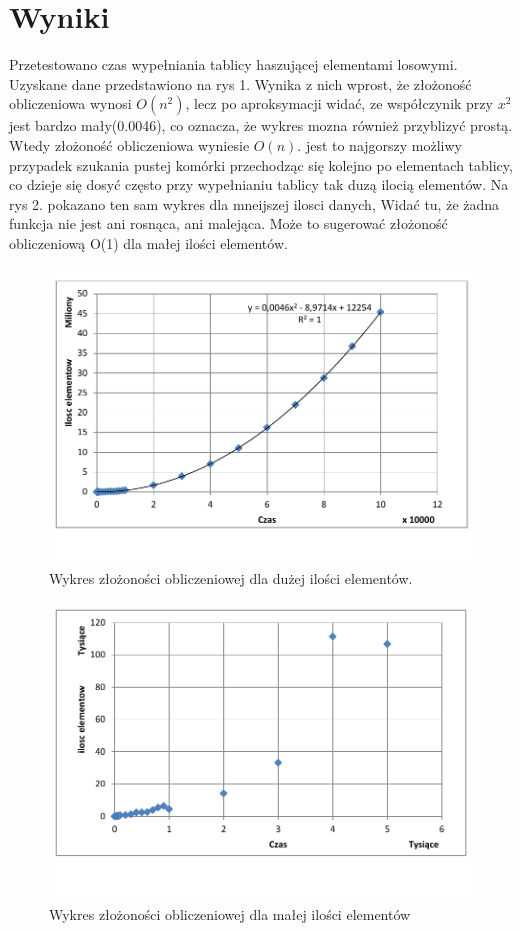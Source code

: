 \section{Wyniki}
Przetestowano czas wypełniania tablicy haszującej elementami losowymi. Uzyskane dane przedstawiono na rys 1. Wynika z nich wprost, że złożoność obliczeniowa wynosi $O(n^{2})$, lecz po aproksymacji widać, ze współczynik przy $x^{2}$ jest bardzo mały(0.0046), co oznacza, że wykres mozna również przyblizyć prostą. Wtedy złożoność obliczeniowa wyniesie $O(n)$. jest to najgorszy możliwy przypadek szukania pustej komórki przechodząc się kolejno po elementach tablicy, co dzieje się dosyć często przy wypełnianiu tablicy tak duzą ilocią elementów. Na rys 2. pokazano ten sam wykres dla mneijszej ilosci danych, Widać tu, że żadna funkcja nie jest ani rosnąca, ani malejąca. Może to sugerować złożoność obliczeniową O(1) dla małej ilości elementów.
\begin{figure}[b!]
\centering
\includegraphics[scale=0.75]{Wykres1.pdf}
\caption{Wykres złożoności obliczeniowej dla dużej ilości elementów.}
\label{fig:wykres1}
\end{figure}
\begin{figure}[t!]
	\centering
	\includegraphics[scale=0.75]{Wykres2.pdf}
	\caption{Wykres złożoności obliczeniowej dla małej ilości elementów}
	\label{fig:wykres2}
\end{figure}
